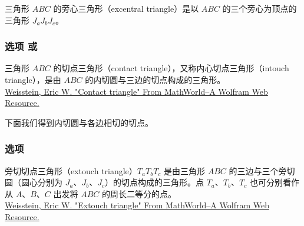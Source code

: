 三角形 $ABC$ 的旁心三角形（excentral triangle）是以 $ABC$ 的三个旁心为顶点的三角形 $J_aJ_bJ_c$。

\begin{tkzexample}[latex=7cm,small]
\end{tkzexample}


\subsubsection{选项  或 }
三角形 $ABC$ 的切点三角形（contact triangle），又称内心切点三角形（intouch triangle），是由 $ABC$ 的内切圆与三边的切点构成的三角形。\\
\href{http://mathworld.wolfram.com/ContactTriangle.html}{Weisstein, Eric W. "Contact triangle" From MathWorld--A Wolfram Web Resource.}

下面我们得到内切圆与各边相切的切点。
\begin{tkzexample}[latex=7cm,small]
\end{tkzexample}

\subsubsection{选项 }
旁切切点三角形（extouch triangle）$T_aT_bT_c$ 是由三角形 $ABC$ 的三边与三个旁切圆（圆心分别为 $J_a$、$J_b$、$J_c$）的切点构成的三角形。点 $T_a$、$T_b$、$T_c$ 也可分别看作从 $A$、$B$、$C$ 出发将 $ABC$ 的周长二等分的点。\\
\href{http://mathworld.wolfram.com/ExtouchTriangle.html}{Weisstein, Eric W. "Extouch triangle" From MathWorld--A Wolfram Web Resource.}

